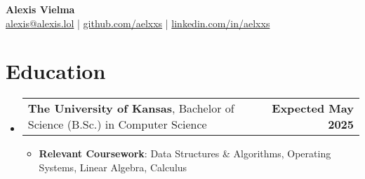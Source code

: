 \documentclass[letter,11pt]{article}
\makeatletter
\newcommand{\resumeItem}[1]{
	\item \small{{#1 \vspace{-2pt}}}
}
\newcommand{\resumeSubheading}[3]{
	\vspace{-2pt}\item
	\begin{tabular*}{1.0\textwidth}[t]{l@{\extracolsep{\fill}}r}
		\textbf{#1}, {\small #2} & \textbf{\small #3} \\
	\end{tabular*}\vspace{-5pt}
}
\newcommand{\resumeSubHeadingListStart}{\begin{itemize}[leftmargin=0.0in, label={}]}
\newcommand{\resumeSubHeadingListEnd}{\end{itemize}}
\newcommand{\resumeItemListStart}{\begin{itemize}[leftmargin=0.5cm]}
\newcommand{\resumeItemListEnd}{\end{itemize}\vspace{-5pt}}
\makeatother
\begin{document}
\begin{center}
    {\huge \textbf{Alexis Vielma}} \\
    \vspace{10pt}
    \href{mailto:alexis@alexis.lol}{alexis@alexis.lol}
	\hspace{7.5pt}|\hspace{7.5pt}
    \href{https://github.com/aelxxs/}{github.com/aelxxs}
	\hspace{7.5pt}|\hspace{7.5pt}
    \href{https://linkedin.com/in/aelxxs/}{linkedin.com/in/aelxxs}
\end{center}
\vspace{-15pt}

\section{Education}
	\resumeSubHeadingListStart
		\resumeSubheading{The University of Kansas}{Bachelor of Science (B.Sc.) in Computer Science}{Expected May 2025}
        	\resumeItemListStart
                \resumeItem{\textbf{Relevant Coursework}{: Data Structures \& Algorithms, Operating Systems, Linear Algebra, Calculus}}
		\resumeItemListEnd
	\resumeSubHeadingListEnd
\vspace{-15pt}

\end{document}
